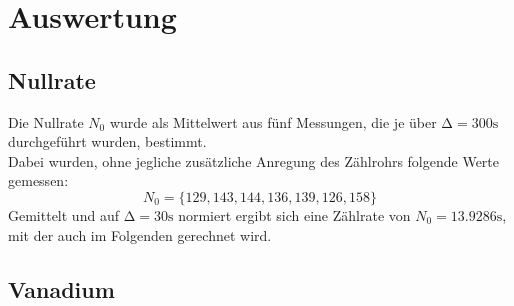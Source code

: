 \newpage
\section{Auswertung}

\subsection{Nullrate}

Die Nullrate $N_0$ wurde als Mittelwert aus fünf Messungen, die je über $\increment=300\si{\second}$ durchgeführt wurden, bestimmt.\\
Dabei wurden, ohne jegliche zusätzliche Anregung des Zählrohrs folgende Werte gemessen:
\begin{equation*}
    N_0 = \{129, 143, 144, 136, 139, 126, 158 \}
\end{equation*}
Gemittelt und auf $\increment=30\si{\second}$ normiert ergibt sich eine Zählrate von $N_0= 13.9286\si{\second}$, mit der auch im Folgenden gerechnet wird.\\

\newpage
\subsection{Vanadium}


